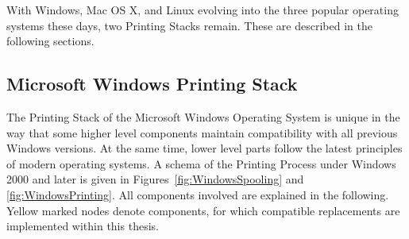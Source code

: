 With Windows, Mac OS X, and Linux evolving into the three popular operating systems these days, two Printing Stacks remain.
These are described in the following sections.

\subsection{Microsoft Windows Printing Stack}
\label{sec:WindowsPrinting}
The Printing Stack of the Microsoft Windows Operating System is unique in the way that some higher level components maintain compatibility with all previous Windows versions. At the same time, lower level parts follow the latest principles of modern operating systems.
A schema of the Printing Process under Windows 2000 and later is given in Figures~\ref{fig:WindowsSpooling} and \ref{fig:WindowsPrinting}.
All components involved are explained in the following.
Yellow marked nodes denote components, for which compatible replacements are implemented within this thesis.

